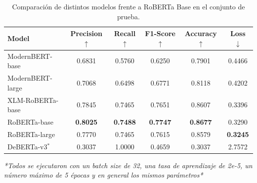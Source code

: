 \begin{table}[ht]
    \centering
    \caption{Comparación de distintos modelos frente a RoBERTa Base en el conjunto de prueba.}
    \label{tab:model_comparison}
    \begin{tabular}{lccccc}
        \toprule
        \textbf{Model}
            & \textbf{Precision} $\uparrow$
            & \textbf{Recall} $\uparrow$
            & \textbf{F1-Score} $\uparrow$
            & \textbf{Accuracy} $\uparrow$
            & \textbf{Loss} $\downarrow$ \\
        \midrule
        ModernBERT-base  & 0.6831 & 0.5760 & 0.6250 & 0.7901 & 0.4466 \\
        ModernBERT-large & 0.7068 & 0.6498 & 0.6771 & 0.8118 & 0.4202 \\
        XLM-RoBERTa-base & 0.7845 & 0.7465 & 0.7651 & 0.8607 & 0.3396 \\
        RoBERTa-base     & \textbf{0.8025} & \textbf{0.7488} & \textbf{0.7747} & \textbf{0.8677} & 0.3290 \\
        RoBERTa-large    & 0.7770 & 0.7465 & 0.7615 & 0.8579 & \textbf{0.3245} \\
        DeBERTa-v3$^{*}$ & 0.3037 & 1.0000 & 0.4659 & 0.3037 & 2.7572 \\
        \bottomrule
    \end{tabular}
    \vspace{0.5em}
    \begin{minipage}{\linewidth}
        \small \textit{*Todos se ejecutaron con un batch size de 32, una tasa de aprendizaje de 2e-5, un número máximo de 5 épocas y en general los mismos parámetros*}
    \end{minipage}
\end{table}
